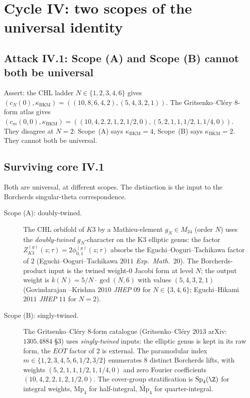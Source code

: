 
\section{Cycle IV: two scopes of the universal identity}
\label{sec:cycle-4-two-scopes}

\subsection*{Attack IV.1: Scope (A) and Scope (B) cannot both be
universal}

Assert: the CHL ladder $N \in \{1, 2, 3, 4, 6\}$ gives
$(c_N(0), \kappa_{\mathrm{BKM}}) = ((10, 8, 6, 4, 2), (5, 4, 3, 2, 1))$.
The Gritsenko--Cl\'ery $8$-form atlas gives
$(c_m(0, 0), \kappa_{\mathrm{BKM}}) = ((10, 4, 2, 2, 1, 2, 1/2, 0),
(5, 2, 1, 1, 1/2, 1, 1/4, 0))$. They disagree at $N = 2$: Scope~(A)
says $\kappa_{\mathrm{BKM}} = 4$, Scope~(B) says $\kappa_{\mathrm{BKM}} = 2$.
They cannot both be universal.

\subsection*{Surviving core IV.1}

Both are universal, at different scopes. The distinction is the input
to the Borcherds singular-theta correspondence.

\begin{description}
\item[Scope (A): doubly-twined.] The CHL orbifold of $K3$ by a
Mathieu-element $g_N \in M_{24}$ (order $N$) uses the
\emph{doubly-twined} $g_N$-character on the K3 elliptic genus: the
factor $Z^{(g)}_{K3}(z; \tau) = 2 \phi^{(g)}_{0, 1}(z; \tau)$ absorbs
the Eguchi--Ooguri--Tachikawa factor of $2$ (Eguchi--Ooguri--Tachikawa
$2011$ \emph{Exp.~Math.}~$20$). The Borcherds-product input is
the twined weight-$0$ Jacobi form at level $N$; the output weight is
$k(N) = 5/N \cdot \gcd(N, 6)$ with values $(5, 4, 3, 2, 1)$ (Govindarajan
--Krishna $2010$ \emph{JHEP} $09$ for $N \in \{3, 4, 6\}$;
Eguchi--Hikami $2011$ \emph{JHEP} $11$ for $N = 2$).
\item[Scope (B): singly-twined.] The Gritsenko--Cl\'ery $8$-form
catalogue (Gritsenko--Cl\'ery $2013$ arXiv:$1305.4884$ \S$3$) uses
\emph{singly-twined} inputs: the elliptic genus is kept in its raw form,
the $EOT$ factor of $2$ is external. The paramodular index $m \in \{1,
2, 3, 4, 5, 6, 1/2, 3/2\}$ enumerates $8$ distinct Borcherds lifts,
with weights $(5, 2, 1, 1, 1/2, 1, 1/4, 0)$ and zero Fourier coefficients
$(10, 4, 2, 2, 1, 2, 1/2, 0)$. The cover-group stratification is
$\mathrm{Sp}_4(\Z)$ for integral weights, $\mathrm{Mp}_4$ for
half-integral, $\widetilde{\mathrm{Mp}}_4$ for quarter-integral.
\end{description}

